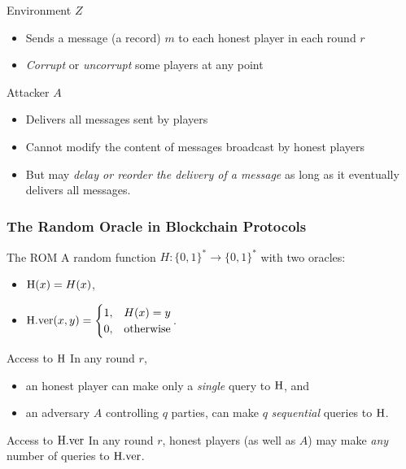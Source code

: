 \documentclass{beamer}
\begin{document}
\begin{spacing}{1.2}
\begin{frame}
	\begin{block}{Environment $Z$}
		\begin{itemize}
			\item Sends a message (a record) $m$ to each honest player in each round $r$
			\item \textit{Corrupt} or \textit{uncorrupt} some players at any point
		\end{itemize}
	\end{block}
	
	\begin{block}{Attacker $A$}
		\begin{itemize}
			\item Delivers all messages sent by players
			\item Cannot modify the content of messages broadcast by honest players
			\item But may \textit{delay or reorder the delivery of a message} as long as it eventually delivers all messages.
		\end{itemize}
	\end{block}
\end{frame}

\begin{frame}
	\frametitle{The Random Oracle in Blockchain Protocols}
	\vspace{-5pt}
	\begin{block}{The ROM}
		A random function $H : \{0, 1\}^* \rightarrow \{0, 1\}^*$ with two oracles:
		\begin{itemize}
			\item ${\rm H}(x) = H(x)$,
			\item ${\rm H.ver}(x,y)	 =
				\begin{cases}
					1, & H(x) = y\\
					0, & {\rm otherwise}
				\end{cases}$.
	   \end{itemize}
	\end{block}
	\vspace{10pt}
	\begin{block}{Access to ${\rm H}$}
		In any round $r$,
		\begin{itemize}
			\item an honest player can make only a \textit{single} query to ${\rm H}$, and
			\item an adversary $A$ controlling $q$ parties, can make $q$ \textit{sequential} queries to ${\rm H}$.
		\end{itemize}
	\end{block}
	\vspace{10pt}
	\begin{block}{Access to ${\rm H.ver}$}
		In any round $r$, honest players (as well as $A$) may make \textit{any} number of queries to ${\rm H.ver}$.
	\end{block}
\end{frame}


\end{spacing}
\end{document}
